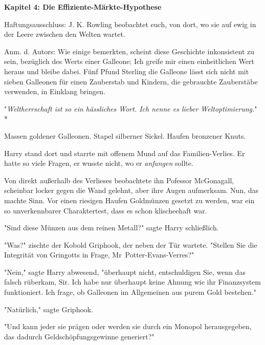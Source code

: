 

\hypertarget{die-effiziente-muxe4rkte-hypothese}{%

\textbf{Kapitel 4: Die Effiziente-Märkte-Hypothese}

Haftungsausschluss: J. K. Rowling beobachtet euch, von dort, wo sie auf ewig in der Leere zwischen den Welten wartet.

Anm. d. Autors: Wie einige bemerkten, scheint diese Geschichte inkonsistent zu sein, bezüglich des Werts einer Galleone; Ich greife mir einen einheitlichen Wert heraus und bleibe dabei. Fünf Pfund Sterling die Galleone lässt sich nicht mit sieben Galleonen für einen Zauberstab und Kindern, die gebrauchte Zauberstäbe verwenden, in Einklang bringen.

\later

"\emph{Weltherrschaft ist so ein hässliches Wort. Ich nenne es lieber Weltoptimierung.}" *

\later

Massen goldener Galleonen. Stapel silberner Sickel. Haufen bronzener Knuts.

Harry stand dort und starrte mit offenem Mund auf das Familien-Verlies. Er hatte so viele Fragen, er wusste nicht, wo er \emph{anfangen} sollte.

Von direkt außerhalb des Verlieses beobachtete ihn Pofessor McGonagall, scheinbar locker gegen die Wand gelehnt, aber ihre Augen aufmerksam. Nun, das machte Sinn. Vor einen riesigen Haufen Goldmünzen gesetzt zu werden, war ein so unverkennbarer Charaktertest, dass es schon klischeehaft war.

"Sind diese Münzen aus dem reinen Metall?" sagte Harry schließlich.

"Was?" zischte der Kobold Griphook, der neben der Tür wartete. "Stellen Sie die Integrität von Gringotts in Frage, Mr~Potter-Evans-Verres?"

"Nein," sagte Harry abwesend, "überhaupt nicht, entschuldigen Sie, wenn das falsch rüberkam, Sir. Ich habe nur überhaupt keine Ahnung wie ihr Finanzsystem funktioniert. Ich frage, ob Galleonen im Allgemeinen aus purem Gold bestehen."

"Natürlich," sagte Griphook.

"Und kann jeder sie prägen oder werden sie durch ein Monopol herausgegeben, das dadurch Geldschöpfungsgewinne generiert?"

}
